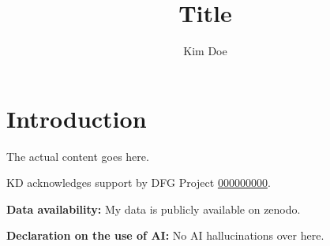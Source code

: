 \documentclass{eceasst}
\title{Title} %
\author{Kim Doe\authorOrcid{0000-0003-0000-0000}\authorRef{1}} %
\institute{Fantasy University\autlabel{1}} %
\newcommand{\geprislink}[1]{\href{https://gepris.dfg.de/gepris/projekt/#1?language=en}{#1}}
\newenvironment{aiuse}{%
  \par\vspace{11pt}%
  \noindent\textbf{Declaration on the use of AI:}\enspace}{%
  \par\vspace{11pt}}
\newenvironment{data}{%
  \par\vspace{11pt}%
  \noindent\textbf{Data availability:}\enspace}{%
  \par\vspace{11pt}}
\begin{document}
\maketitle

\section{Introduction}

The actual content goes here.

\begin{acknowledge}
KD acknowledges support by DFG Project \geprislink{000000000}.
\end{acknowledge}

\begin{data}
My data is publicly available on zenodo.
\end{data}

\begin{aiuse}
No AI hallucinations over here.
\end{aiuse}

%
%
\end{document}

